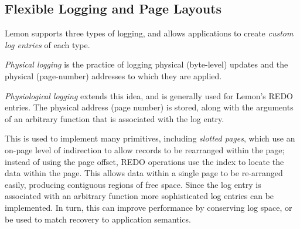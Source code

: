 \documentclass[10pt,letterpaper,twocolumn,english]{article}
\newcommand{\yad}{Lemon\xspace}
\begin{document}
%


\subsection{Flexible Logging and Page Layouts}
\label{flex-logging}
\label{page-layouts}

\yad supports three types of logging, and allows applications to create
{\em custom log entries} of each type.

{\em Physical logging } 
is the practice of logging physical (byte-level) updates
and the physical (page-number) addresses to which they are applied.

{\em Physiological logging } extends this idea, and is generally used 
for \yad's REDO entries.  The physical address (page number) is
stored, along with the arguments of an arbitrary function that 
is associated with the log entry.

This is used to implement many primitives, including {\em slotted pages}, which use
an on-page level of indirection to allow records to be rearranged
within the page; instead of using the page offset, REDO operations use
the index to locate the data within the page. This allows data within a single
page to be re-arranged easily, producing contiguous regions of
free space.  Since the log entry is associated with an arbitrary function
more sophisticated log entries can be implemented.  In turn, this can improve 
performance by conserving log space, or be used to match recovery to application
semantics.

\end{document}
